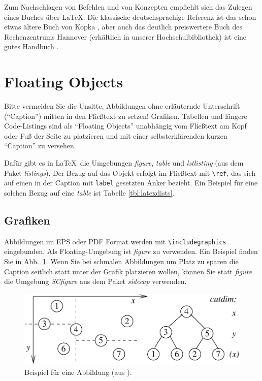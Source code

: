 \documentclass[12pt]{article}
\begin{document}
Zum Nachschlagen von Befehlen und von Konzepten empfiehlt sich das
Zulegen eines Buches über \LaTeX. Die klassische deutschsprachige Referenz
ist das schon etwas ältere Buch von Kopka \cite{kopka91}, aber auch das
deutlich preiswertere Buch des Rechenzentrums Hannover (erhältlich
in unserer Hochschulbibliothek) ist eine gutes Handbuch \cite{rrzn06}.

\section{Floating Objects}
\label{sec:floats}
Bitte vermeiden Sie die Unsitte, Abbildungen ohne erläuternde Unterschrift
(``Caption'') mitten in den Fließtext zu setzen! Grafiken, Tabellen und längere
Code-Listings sind als ``Floating Objects'' unabhängig vom Fließtext am Kopf
oder Fuß der Seite zu platzieren und mit einer selbsterklärenden kurzen
``Caption'' zu versehen.

Dafür gibt es in \LaTeX\ die Umgebungen {\em figure}, {\em table} und
{\em lstlisting} (aus dem Paket {\em listings}). Der Bezug auf das Objekt
erfolgt im Fließtext mit \verb+\ref+, das sich auf einen in der Caption
mit \verb+label+ gesetzten Anker bezieht. Ein Beispiel für eine solchen
Bezug auf eine {\em table} ist Tabelle \ref{tbl:latexdists}.

\subsection{Grafiken}
Abbildungen im EPS oder PDF Format werden mit \verb+\includegraphics+
eingebunden. Als Floating-Umgebung ist {\em figure} zu verwenden. Ein Beispiel
finden Sie in Abb.~\ref{fig:grafik}. Wenn Sie bei schmalen Abbildungen
um Platz zu sparen die Caption seitlich statt unter der Grafik platzieren
wollen, können Sie statt {\em figure} die Umgebung {\em SCfigure}
aus dem Paket {\em sidecap} verwenden.

\begin{figure}[t]
\centering
\includegraphics[scale=0.7]{grafik}
\caption{\label{fig:grafik} Beispiel für eine Abbildung (aus \cite{dalitz09}).
}
\end{figure}
\end{document}
